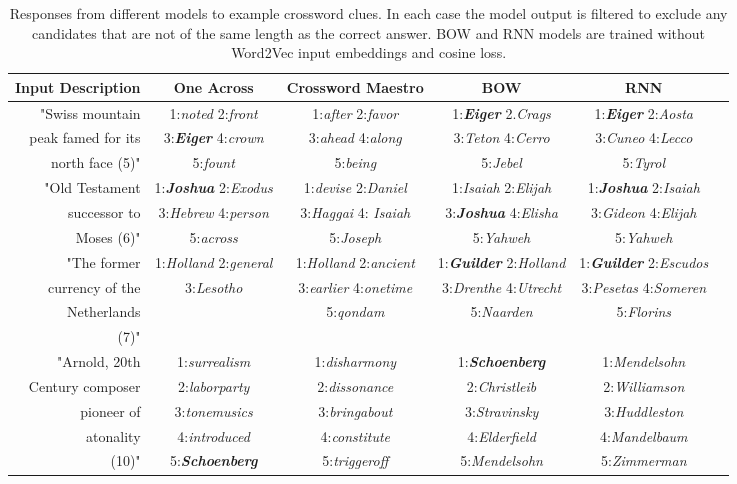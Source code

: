 \begin{table*}[ht]
{\small
\emph
\hfill{}
\begin{tabular}{r|ccccc|}
\bf Input Description & \bf One Across& \bf Crossword Maestro & \bf BOW &  \bf RNN  \\
\hline

\rule{0pt}{3ex} 

  "Swiss mountain & 1:\emph{noted} 2:\emph{front} & 1:\emph{after} 2:\emph{favor} & 1:\emph{\bf Eiger} 2.\emph{Crags}   &  1:\emph{\bf Eiger} 2:\emph{Aosta}  \\
peak famed for its & 3:\emph{\bf Eiger} 4:\emph{crown} & 3:\emph{ahead} 4:\emph{along} &   3:\emph{Teton} 4:\emph{Cerro}  & 3:\emph{Cuneo} 4:\emph{Lecco}\\
 north face (5)" & 5:\emph{fount} &  5:\emph{being} &  5:\emph{Jebel} &  5:\emph{Tyrol} \\
\rule{0pt}{3ex} 
  "Old Testament & 1:\emph{\bf Joshua} 2:\emph{Exodus} &  1:\emph{devise} 2:\emph{Daniel}& 1:\emph{Isaiah} 2:\emph{Elijah}   &  1:\emph{\bf Joshua} 2:\emph{Isaiah}  \\
successor to & 3:\emph{Hebrew} 4:\emph{person} &   3:\emph{Haggai} 4:\emph{ Isaiah}  &3:\emph{\bf Joshua} 4:\emph{Elisha}  & 3:\emph{Gideon} 4:\emph{Elijah}\\
 Moses (6)" & 5:\emph{across} & 5:\emph{Joseph}&  5:\emph{Yahweh} &  5:\emph{Yahweh} \\	
\rule{0pt}{3ex} 
  "The former & 1:\emph{Holland} 2:\emph{general} &  1:\emph{Holland} 2:\emph{ancient} & 1:\emph{\bf Guilder} 2:\emph{Holland}   &  1:\emph{\bf 	Guilder} 2:\emph{Escudos}  \\
currency of the  & 3:\emph{Lesotho} &   3:\emph{earlier} 4:\emph{onetime}&   3:\emph{Drenthe} 4:\emph{Utrecht}  & 3:\emph{Pesetas} 4:\emph{Someren}\\
 Netherlands&  &5:\emph{qondam}&  5:\emph{Naarden} &  5:\emph{Florins} \\
 (7)"&  \\
\rule{0pt}{3ex} 
  "Arnold, 20th & 1:\emph{surrealism} &  1:\emph{disharmony}  & 1:\emph{\bf Schoenberg}   &  1:\emph{Mendelsohn} \\
Century composer &  2:\emph{laborparty}  &   2:\emph{dissonance} &  2:\emph{Christleib}  &  2:\emph{Williamson}  \\
pioneer of &  3:\emph{tonemusics}  &  3:\emph{bringabout} &  3:\emph{Stravinsky}  &  3:\emph{Huddleston}   \\
 atonality &4:\emph{introduced}  & 4:\emph{constitute} &4:\emph{Elderfield} & 4:\emph{Mandelbaum} \\
(10)"& 5:\emph{\bf Schoenberg} & 5:\emph{triggeroff} & 5:\emph{Mendelsohn} &  5:\emph{Zimmerman}\\

\end{tabular}}
\hfill{}
\caption{Responses from different models to example crossword clues. In each case the model output is filtered to exclude any candidates that are not of the same length as the correct answer. BOW and RNN models are trained without Word2Vec input embeddings and cosine loss.}
\label{egs}
\end{table*}

